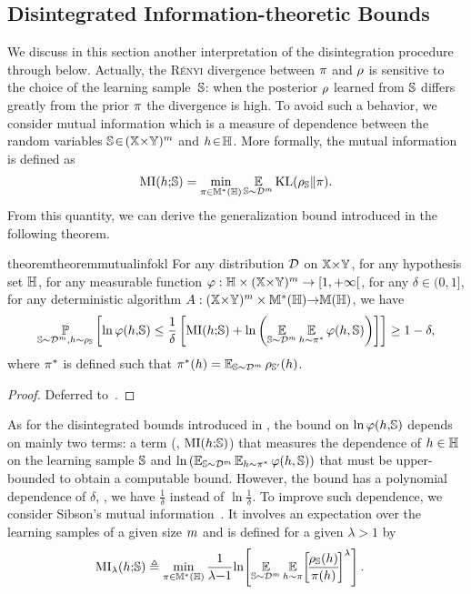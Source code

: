\begin{noaddcontents}
\section{Disintegrated Information-theoretic Bounds}
\label{chap:dis-pra:sec:info-theoretic}
We discuss in this section another interpretation of the disintegration procedure through  below.
Actually, the \textsc{Rényi} divergence between $\P$ and $\Q$ is sensitive to the choice of the learning \mbox{sample $\S$}: when the posterior $\Q$ learned from $\S$ differs greatly from the prior $\P$ the divergence is high. 
To avoid such a behavior, we consider mutual information which is a measure of dependence between the random variables $\S\!\in\!(\X{\times}\Y)^\m$ and $\h\!\in\!\H$.
More formally, the mutual information is defined as
\begin{align*}
    \MI(\h{;} \S) = \min_{\P\in\M^{*}(\H)}\EE_{\S\sim\D^\m}\KL(\AQ\|\P).
\end{align*}
From this quantity, we can derive the generalization bound introduced in the following theorem.
\begin{restatable}{theorem}{theoremmutualinfokl}
For any distribution $\D$ on $\X{\times}\Y$, for any hypothesis set $\H$, for any measurable function $\varphi:\H\times (\X{\times}\Y)^{\m}\rightarrow [1, +\infty[$, for any $\delta\in(0,1]$, for any deterministic algorithm $A:(\X{\times}\Y)^{\m}\times\M^{*}(\H){\rightarrow} \M(\H)$, we have
\begin{align*}
    \PP_{\S\sim\D^{\m}, \h\sim \AQ}\LB\ln\varphi(\h,\!\S)\le \frac{1}{\delta}\LB \MI(\h{;}\S) +\ln\LP\EE_{\S\sim\D^\m}\EE_{\h\sim\P^*}\varphi(\h, \S)\RP\RB \RB \ge 1-\delta,
\end{align*}
where $\P^*$ is defined such that $\P^*(\h)=\EE_{\S\sim\D^\m}\AQp(\h)$.
\label{chap:dis-pra:theorem:mutual-info-kl}
\end{restatable}
\begin{proof}
Deferred to~.
\end{proof}

As for the disintegrated bounds introduced in , the bound on $\ln \varphi(\h,\!\S)$ depends on mainly two terms: a term (\ie, $\MI(\h{;}\S)$) that measures the dependence of $\h\in\H$ on the learning sample $\S$ and $\ln\LP\EE_{\S\sim\D^\m}\EE_{\h\sim\P^*}\varphi(\h, \S)\RP$ that must be upper-bounded to obtain a computable bound.
However, the bound has a polynomial dependence of $\delta$, \ie, we have $\frac{1}{\delta}$ instead of $\ln\frac{1}{\delta}$.
To improve such dependence, we consider Sibson's mutual information~\citep{Verdu2015}.
It involves an expectation over the learning samples of a given size $\m$ and is defined for a given $\lambda{>}1$ by
\begin{align*}
\MI_{\lambda}(\h{;}\S) 
&\defeq \min_{\P\in\M^{*}(\H)}  \frac{1}{\lambda{-}1}\!\ln\!\LB\EE_{\S\sim\D^{\m}}\EE_{\h\sim \P}\!\LB\!\frac{\AQ(\h)}{\P(\h)}\!\RB^{\lambda}\RB.
\end{align*}


\end{noaddcontents}
